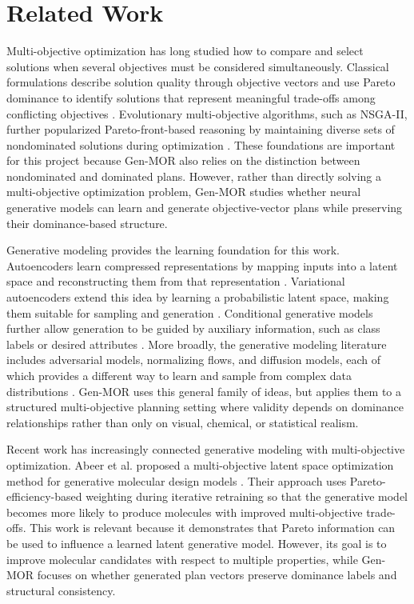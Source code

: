 \section{Related Work}

Multi-objective optimization has long studied how to compare and select solutions when several objectives must be considered simultaneously. Classical formulations describe solution quality through objective vectors and use Pareto dominance to identify solutions that represent meaningful trade-offs among conflicting objectives \cite{miettinen1999nonlinear}. Evolutionary multi-objective algorithms, such as NSGA-II, further popularized Pareto-front-based reasoning by maintaining diverse sets of nondominated solutions during optimization \cite{deb2002fast}. These foundations are important for this project because Gen-MOR also relies on the distinction between nondominated and dominated plans. However, rather than directly solving a multi-objective optimization problem, Gen-MOR studies whether neural generative models can learn and generate objective-vector plans while preserving their dominance-based structure.

Generative modeling provides the learning foundation for this work. Autoencoders learn compressed representations by mapping inputs into a latent space and reconstructing them from that representation \cite{hinton2006reducing}. Variational autoencoders extend this idea by learning a probabilistic latent space, making them suitable for sampling and generation \cite{kingma2014autoencoding}. Conditional generative models further allow generation to be guided by auxiliary information, such as class labels or desired attributes \cite{sohn2015learning}. More broadly, the generative modeling literature includes adversarial models, normalizing flows, and diffusion models, each of which provides a different way to learn and sample from complex data distributions \cite{goodfellow2014generative,papamakarios2021normalizing,ho2020denoising}. Gen-MOR uses this general family of ideas, but applies them to a structured multi-objective planning setting where validity depends on dominance relationships rather than only on visual, chemical, or statistical realism.

Recent work has increasingly connected generative modeling with multi-objective optimization. Abeer et al. proposed a multi-objective latent space optimization method for generative molecular design models \cite{abeer2024multiobjective}. Their approach uses Pareto-efficiency-based weighting during iterative retraining so that the generative model becomes more likely to produce molecules with improved multi-objective trade-offs. This work is relevant because it demonstrates that Pareto information can be used to influence a learned latent generative model. However, its goal is to improve molecular candidates with respect to multiple properties, while Gen-MOR focuses on whether generated plan vectors preserve dominance labels and structural consistency.

